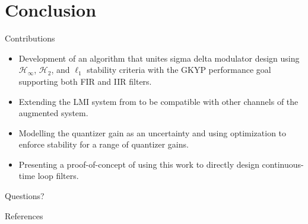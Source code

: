 \documentclass[10pt,usenames,dvipsnames]{beamer}
\begin{document}
\section{Conclusion}

\begin{frame}{Contributions}

\begin{itemize}
	\item Development of an algorithm that unites sigma delta modulator design using $\mathcal{H}_\infty$, $\mathcal{H}_2$, and $\ell_1$ stability criteria with the GKYP performance goal supporting both FIR and IIR filters. \pause
	\item Extending the LMI system from \cite{Li2014} to be compatible with other channels of the augmented system. \pause
	\item Modelling the quantizer gain as an uncertainty and using optimization to enforce stability for a range of quantizer gains. \pause
	\item Presenting a proof-of-concept of using this work to directly design continuous-time loop filters. \pause
\end{itemize}

\end{frame}

{
\begin{frame}[standout]
	Questions?
\end{frame}
}

\begin{frame}[allowframebreaks]{References}

	
	

\end{frame}

\appendix
\end{document}
